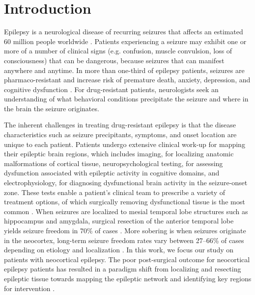 
\chapter{Introduction}

\ifpdf
    \graphicspath{{introduction/figures/PNG/}{introduction/figures/PDF/}{introduction/figures/}}
\else
    \graphicspath{{introduction/figures/EPS/}{introduction/figures/}}
\fi

Epilepsy is a neurological disease of recurring seizures that affects an estimated 60 million people worldwide \cite{kwan2000early}. Patients experiencing a seizure may exhibit one or more of a number of clinical signs (e.g. confusion, muscle convulsion, loss of consciousness) that can be dangerous, because seizures that can manifest anywhere and anytime. In more than one-third of epilepsy patients, seizures are pharmaco-resistant and increase risk of premature death, anxiety, depression, and cognitive dysfunction \cite{kwan2000early, kwan2011drug-resistant}. For drug-resistant patients, neurologists seek an understanding of what behavioral conditions precipitate the seizure and where in the brain the seizure originates.

The inherent challenges in treating drug-resistant epilepsy is that the disease characteristics such as seizure precipitants, symptoms, and onset location are unique to each patient. Patients undergo extensive clinical work-up for mapping their epileptic brain regions, which includes imaging, for localizing anatomic malformations of cortical tissue, neuropsychological testing, for assessing dysfunction associated with epileptic activity in cognitive domains, and electrophysiology, for diagnosing dysfunctional brain activity in the seizure-onset zone. These tests enable a patient's clinical team to prescribe a variety of treatment options, of which surgically removing dysfunctional tissue is the most common \cite{kwan2011drug-resistant}. When seizures are localized to mesial temporal lobe structures such as hippocampus and amygdala, surgical resection of the anterior temporal lobe yields seizure freedom in 70\% of cases \cite{kwan2011drug-resistant}. More sobering is when seizures originate in the neocortex, long-term seizure freedom rates vary between 27--66\% of cases depending on etiology and localization \cite{tellez-zenteno2005long-term}. In this work, we focus our study on patients with neocortical epilepsy. The poor post-surgical outcome for neocortical epilepsy patients has resulted in a paradigm shift from localizing and resecting epileptic tissue towards mapping the epileptic network and identifying key regions for intervention \cite{spencer2002neural, kramer2012epilepsy, lehnertz2014evolving}.

